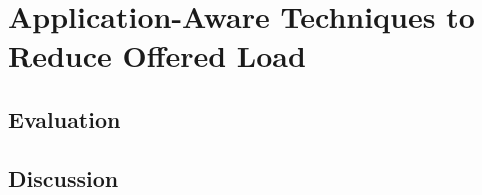 \chapter{Application-Aware Techniques to Reduce Offered Load}





\section{Evaluation}
\section{Discussion}

% 
% 